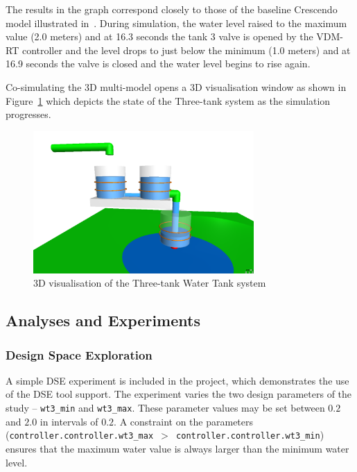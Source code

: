 The results in the graph correspond closely to those of the baseline Crescendo model illustrated in~\cite{INTOCPSD3.4}. During simulation, the water level raised to the maximum value (2.0 meters) and at 16.3 seconds the tank 3 valve is opened by the VDM-RT controller and the level drops to just below the minimum (1.0 meters) and at 16.9 seconds the valve is closed and the water level begins to rise again.

Co-simulating the 3D multi-model opens a 3D visualisation window as shown in Figure~\ref{fig:threetank3d} which depicts the state of the Three-tank system as the simulation progresses. 

\begin{figure}[htbp]
\begin{center}
\includegraphics[width=0.75\textwidth]{threetank/TTWT_3D.png}
\caption{3D visualisation of the Three-tank Water Tank system}
\label{fig:threetank3d}
\end{center}
\end{figure}

\subsection{Analyses and Experiments}

\subsubsection{Design Space Exploration}
\label{sec:threetank_dse}

A simple DSE experiment is included in the project, which demonstrates the use of the DSE tool support. The experiment varies the two design parameters of the study -- \texttt{wt3\_min} and \texttt{wt3\_max}. These parameter values may be set between $0.2$ and $2.0$ in intervals of $0.2$. A constraint on the parameters (\texttt{{controller}.controller.wt3\_max $>$ {controller}.controller.wt3\_min}) ensures that the maximum water value is always larger than the minimum water level. 

